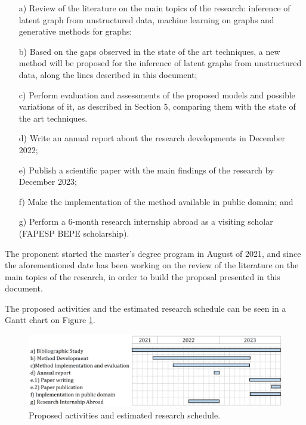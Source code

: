 \documentclass[12pt,a4paper]{article}
\begin{document}
	\begin{itemize}
	\item[a)] Review of the literature on the main topics of the research: inference of latent graph from unstructured data, machine learning on graphs and generative methods for graphs;
	\item[b)] Based on the gaps observed in the state of the art techniques, a new method will be proposed for the inference of latent graphs from unstructured data, along the lines described in this document;
	\item[c)] Perform evaluation and assessments of the proposed models and possible variations of it, as described in Section 5, comparing them with the state of the art techniques.
	\item[d)] Write an annual report about the research developments in December 2022;
	\item[e)] Publish a scientific paper with the main findings of the research by December 2023;
	\item[f)] Make the implementation of the method available in public domain; and
	\item[g)] Perform a 6-month research internship abroad as a visiting scholar (FAPESP BEPE scholarship).
	\end{itemize}

	The proponent started the master's degree program in August of 2021, and since the aforementioned date has been working on the review of the literature on the main topics of the research, in order to build the proposal presented in this document.

	The proposed activities and the estimated research schedule can be seen in a Gantt chart on Figure \ref{plan}.

	\begin{figure}[hbtp]
		\centering \includegraphics[scale=0.40]{plan_v3.png}
		\caption{Proposed activities and estimated research schedule. \label{plan}}
	\end{figure}

	\printbibliography
\end{document}
